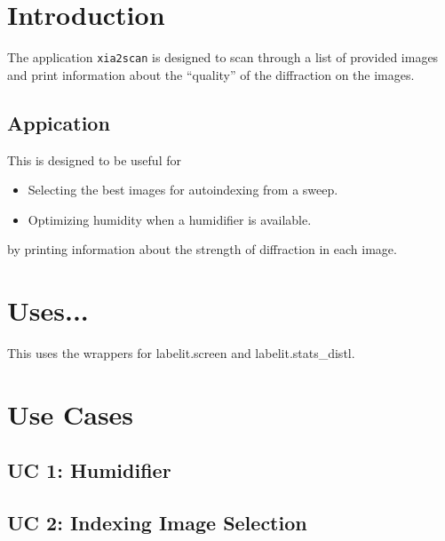 \documentclass[a4paper, 11pt]{article}
\begin{document}
\section{Introduction}

The application \verb|xia2scan| is designed to scan through a list of 
provided images and print information about the ``quality'' of the 
diffraction on the images.

\subsection{Appication}

This is designed to be useful for 

\begin{itemize}
\item{Selecting the best images for autoindexing from a sweep.}
\item{Optimizing humidity when a humidifier is available.}
\end{itemize}

\noindent
by printing information about the strength of diffraction in each image.

\section{Uses...}

This uses the wrappers for labelit.screen and labelit.stats\_distl.

\section{Use Cases}

\subsection{UC 1: Humidifier}


\subsection{UC 2: Indexing Image Selection}
\end{document}
